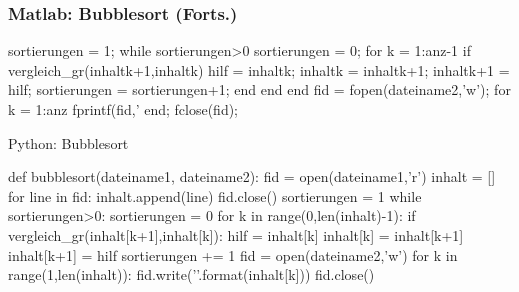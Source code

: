 \documentclass[hyperref={xetex}]{beamer}
\begin{document}
%
%
\begin{frame}[fragile]\frametitle{Matlab: Bubblesort (Forts.)}
\begin{matlabin}
sortierungen = 1; 
while sortierungen>0
    sortierungen = 0;
    for k = 1:anz-1
        if vergleich_gr(inhalt{k+1},inhalt{k})
            hilf = inhalt{k}; inhalt{k} = inhalt{k+1}; 
            inhalt{k+1} = hilf;
            sortierungen = sortierungen+1;
        end
    end
end
fid = fopen(dateiname2,'w');
for k = 1:anz
   fprintf(fid,'%
end;
fclose(fid);
\end{matlabin}
\end{frame}

\begin{frame}[fragile]{Python: Bubblesort}
  \begin{pyin}
def bubblesort(dateiname1, dateiname2):
   fid = open(dateiname1,'r')
   inhalt = []
   for line in fid:
       inhalt.append(line)
   fid.close()
   sortierungen = 1
   while sortierungen>0:
       sortierungen = 0
       for k in range(0,len(inhalt)-1):
           if vergleich_gr(inhalt[k+1],inhalt[k]):
               hilf = inhalt[k]
               inhalt[k] = inhalt[k+1]
               inhalt[k+1] = hilf
               sortierungen += 1
   fid = open(dateiname2,'w')
   for k in range(1,len(inhalt)):
       fid.write('{}'.format(inhalt[k]))
   fid.close()    
  \end{pyin}
\end{frame}
\end{document}
